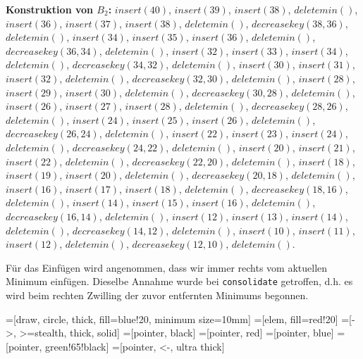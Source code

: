 \documentclass{article}
\begin{document}
\textbf{Konstruktion von $B_2$:} \newline
$insert(40)$, $insert(39)$, $insert(38)$, $deletemin()$, \newline
$insert(36)$, $insert(37)$, $insert(38)$, $deletemin()$, $decreasekey(38, 36)$, $deletemin()$, \newline
$insert(34)$, $insert(35)$, $insert(36)$, $deletemin()$, $decreasekey(36, 34)$, $deletemin()$, \newline
$insert(32)$, $insert(33)$, $insert(34)$, $deletemin()$, $decreasekey(34, 32)$, $deletemin()$, \newline
$insert(30)$, $insert(31)$, $insert(32)$, $deletemin()$, $decreasekey(32, 30)$, $deletemin()$, \newline
$insert(28)$, $insert(29)$, $insert(30)$, $deletemin()$, $decreasekey(30, 28)$, $deletemin()$, \newline
$insert(26)$, $insert(27)$, $insert(28)$, $deletemin()$, $decreasekey(28, 26)$, $deletemin()$, \newline
$insert(24)$, $insert(25)$, $insert(26)$, $deletemin()$, $decreasekey(26, 24)$, $deletemin()$, \newline
$insert(22)$, $insert(23)$, $insert(24)$, $deletemin()$, $decreasekey(24, 22)$, $deletemin()$, \newline
$insert(20)$, $insert(21)$, $insert(22)$, $deletemin()$, $decreasekey(22, 20)$, $deletemin()$, \newline
$insert(18)$, $insert(19)$, $insert(20)$, $deletemin()$, $decreasekey(20, 18)$, $deletemin()$, \newline
$insert(16)$, $insert(17)$, $insert(18)$, $deletemin()$, $decreasekey(18, 16)$, $deletemin()$, \newline
$insert(14)$, $insert(15)$, $insert(16)$, $deletemin()$, $decreasekey(16, 14)$, $deletemin()$, \newline
$insert(12)$, $insert(13)$, $insert(14)$, $deletemin()$, $decreasekey(14, 12)$, $deletemin()$, \newline
$insert(10)$, $insert(11)$, $insert(12)$, $deletemin()$, $decreasekey(12, 10)$, $deletemin()$.

F{\"u}r das Einf{\"u}gen wird angenommen, dass wir immer rechts vom aktuellen
Minimum einf{\"u}gen. Dieselbe Annahme wurde bei \texttt{consolidate} getroffen,
d.h. es wird beim rechten Zwilling der zuvor entfernten Minimums begonnen.

=[draw, circle, thick, fill=blue!20, minimum size=10mm]
=[elem, fill=red!20]
=[->, >=stealth, thick, solid]
=[pointer, black]
=[pointer, red]
=[pointer, blue]
=[pointer, green!65!black]
=[pointer, <-, ultra thick]
\end{document}
